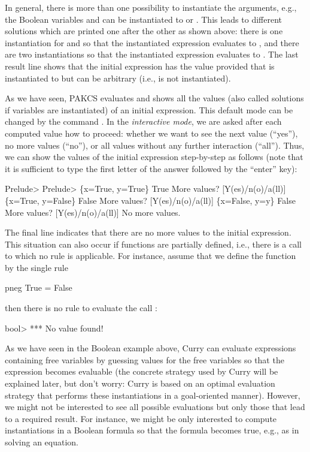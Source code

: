 In general, there is more than one possibility
to instantiate the arguments, e.g., the Boolean variables
 and  can be instantiated to  or .
This leads to different solutions which are printed
one after the other as shown above: there is one instantiation
for  and  so that the instantiated expression
evaluates to , and there are two instantiations
so that the instantiated expression evaluates to .
The last result line shows that the initial expression has the value
 provided that  is instantiated to 
but  can be arbitrary (i.e.,  is not instantiated).

As we have seen, PAKCS evaluates and shows all the values
(also called solutions if variables are instantiated)
of an initial expression. This default mode can be changed
by the command .
In the \emph{interactive mode}, we are asked after each
computed value how to proceed:
whether we want to see the next value (``yes''), no more values (``no''),
or all values without any further interaction (``all'').
Thus, we can show the values of the initial expression
step-by-step as follows (note that it is sufficient to type
the first letter of the answer followed by the ``enter'' key):
\begin{prog}
Prelude> 
Prelude> 
\{x=True, y=True\}  True
More values? [Y(es)/n(o)/a(ll)] 
\{x=True, y=False\} False
More values? [Y(es)/n(o)/a(ll)] 
\{x=False, y=y\} False
More values? [Y(es)/n(o)/a(ll)] 
No more values.
\end{prog}
The final line indicates that there are no more values to the
initial expression. This situation can also occur if functions
are partially defined, i.e., there is a call to which no rule
is applicable. For instance, assume that we define the function
 by the single rule
\begin{curry}
pneg True = False
\end{curry}
then there is no rule to evaluate the call :
\begin{prog}
bool> 
*** No value found!
\end{prog}
As we have seen in the Boolean example above,
Curry can evaluate expressions containing free variables
by guessing values for the free variables so that the expression
becomes evaluable (the concrete strategy used by Curry will be
explained later, but don't worry: Curry is based on an optimal
evaluation strategy \cite{AntoyEchahedHanus00JACM} that performs
these instantiations in a goal-oriented manner).
However, we might not be interested to see
all possible evaluations but only those that lead to a required
result. For instance, we might be only interested to compute
instantiations in a Boolean formula so that the formula becomes true,
e.g., as in solving an equation.

